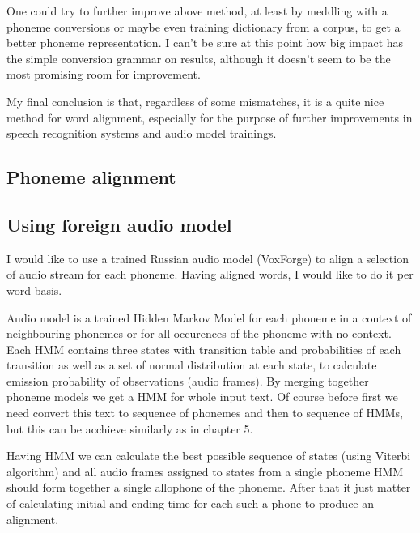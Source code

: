 \documentclass[12pt,a4paper,english]{article}
\begin{document}
One could try to further improve above method, at least by meddling with a phoneme conversions or maybe even training dictionary from a corpus, to get a better phoneme representation. I can't be sure at this point how big impact has the simple conversion grammar on results, although it doesn't seem to be the most promising room for improvement. \newline

My final conclusion is that, regardless of some mismatches, it is a quite nice method for word alignment, especially for the purpose of further improvements in speech recognition systems and audio model trainings. 

\newpage
\begin{center}
    \section{Phoneme alignment}
\end {center}
\setcounter{equation}{0}

\subsection{Using foreign audio model}

I would like to use a trained Russian audio model (VoxForge) to align a selection of audio stream for each phoneme. \newline
Having aligned words, I would like to do it per word basis. \newline

Audio model is a trained Hidden Markov Model for each phoneme in a context of neighbouring phonemes or for all occurences of the phoneme with no context. Each HMM contains three states with transition table and probabilities of each transition as well as a set of normal distribution at each state, to calculate emission probability of observations (audio frames). \newline
By merging together phoneme models we get a HMM for whole input text. Of course before first we need convert this text to sequence of phonemes and then to sequence of HMMs, but this can be acchieve similarly as in chapter 5. \newline

Having HMM we can calculate the best possible sequence of states (using Viterbi algorithm) and all audio frames assigned to states from a single phoneme HMM should form together a single allophone of the phoneme. After that it just matter of calculating initial and ending time for each such a phone to produce an alignment. \newline
\end{document}
